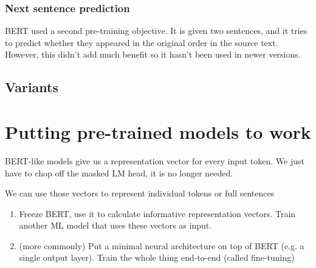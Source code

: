 \documentclass[11pt]{article}
\begin{document}
\subsubsection{Next sentence prediction}

BERT used a second pre-training objective. It is given two sentences, and it tries to predict whether they appeared in the original order in the source text. However, this didn't add much benefit so it hasn't been used in newer versions.

\begin{figure}[H]
    \centering
\end{figure}    

\subsection{Variants}

\begin{figure}[H]
    \centering
\end{figure}    

\section{Putting pre-trained models to work}

BERT-like models give us a representation vector for every input token. We just have to chop off the masked LM head, it is no longer needed.

We can use those vectors to represent individual tokens or full sentences

\begin{enumerate}
    \item Freeze BERT, use it to calculate informative representation vectors. Train another ML model that uses these vectors as input.
    \item (more commonly) Put a minimal neural architecture on top of BERT (e.g. a single output layer). Train the whole thing end-to-end (called fine-tuning)
\end{enumerate}
\end{document}

